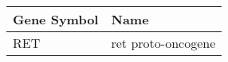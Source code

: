 \begin{tabular}{ll}
\toprule
Gene Symbol &               Name \\
\midrule
        RET & ret proto-oncogene \\
\bottomrule
\end{tabular}
